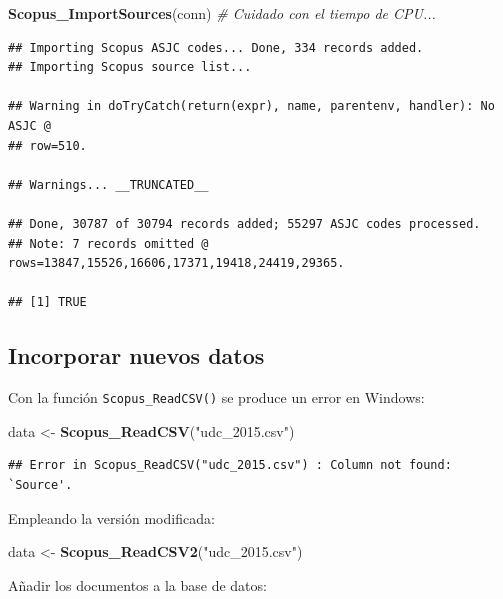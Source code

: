\documentclass[]{book}
\newenvironment{Shaded}{\begin{snugshade}}{\end{snugshade}}
\newcommand{\CommentTok}[1]{\textcolor[rgb]{0.56,0.35,0.01}{\textit{#1}}}
\newcommand{\KeywordTok}[1]{\textcolor[rgb]{0.13,0.29,0.53}{\textbf{#1}}}
\newcommand{\NormalTok}[1]{#1}
\newcommand{\StringTok}[1]{\textcolor[rgb]{0.31,0.60,0.02}{#1}}
\begin{document}
\begin{Shaded}
\begin{Highlighting}[]
\KeywordTok{Scopus_ImportSources}\NormalTok{(conn) }\CommentTok{# Cuidado con el tiempo de CPU...}
\end{Highlighting}
\end{Shaded}

\begin{verbatim}
## Importing Scopus ASJC codes... Done, 334 records added.
## Importing Scopus source list...

## Warning in doTryCatch(return(expr), name, parentenv, handler): No ASJC @
## row=510.

## Warnings... __TRUNCATED__

## Done, 30787 of 30794 records added; 55297 ASJC codes processed.
## Note: 7 records omitted @ rows=13847,15526,16606,17371,19418,24419,29365.

## [1] TRUE
\end{verbatim}

\hypertarget{incorporar-nuevos-datos}{%
\subsection{Incorporar nuevos datos}\label{incorporar-nuevos-datos}}

Con la función \texttt{Scopus\_ReadCSV()} se produce un error en Windows:

\begin{Shaded}
\begin{Highlighting}[]
\NormalTok{data <-}\StringTok{  }\KeywordTok{Scopus_ReadCSV}\NormalTok{(}\StringTok{"udc_2015.csv"}\NormalTok{)}
\end{Highlighting}
\end{Shaded}

\begin{verbatim}
## Error in Scopus_ReadCSV("udc_2015.csv") : Column not found: `Source'.
\end{verbatim}

Empleando la versión modificada:

\begin{Shaded}
\begin{Highlighting}[]
\NormalTok{data <-}\StringTok{  }\KeywordTok{Scopus_ReadCSV2}\NormalTok{(}\StringTok{"udc_2015.csv"}\NormalTok{)}
\end{Highlighting}
\end{Shaded}

Añadir los documentos a la base de datos:
\end{document}
